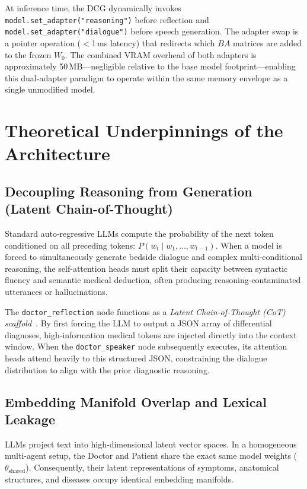 At inference time, the DCG dynamically invokes \texttt{model.set\_adapter("reasoning")} before reflection and \texttt{model.set\_adapter("dialogue")} before speech generation. The adapter swap is a pointer operation ($<$1\,ms latency) that redirects which $BA$ matrices are added to the frozen $W_0$. The combined VRAM overhead of both adapters is approximately 50\,MB---negligible relative to the base model footprint---enabling this dual-adapter paradigm to operate within the same memory envelope as a single unmodified model.

\section{Theoretical Underpinnings of the Architecture}

\subsection{Decoupling Reasoning from Generation (Latent Chain-of-Thought)}

Standard auto-regressive LLMs compute the probability of the next token conditioned on all preceding tokens: $P(w_t \mid w_1, \ldots, w_{t-1})$. When a model is forced to simultaneously generate bedside dialogue and complex multi-conditional reasoning, the self-attention heads must split their capacity between syntactic fluency and semantic medical deduction, often producing reasoning-contaminated utterances or hallucinations.

The \texttt{doctor\_reflection} node functions as a \textit{Latent Chain-of-Thought (CoT) scaffold}~\cite{wang2024survey}. By first forcing the LLM to output a JSON array of differential diagnoses, high-information medical tokens are injected directly into the context window. When the \texttt{doctor\_speaker} node subsequently executes, its attention heads attend heavily to this structured JSON, constraining the dialogue distribution to align with the prior diagnostic reasoning.

\subsection{Embedding Manifold Overlap and Lexical Leakage}

LLMs project text into high-dimensional latent vector spaces. In a homogeneous multi-agent setup, the Doctor and Patient share the exact same model weights ($\theta_{\text{shared}}$). Consequently, their latent representations of symptoms, anatomical structures, and diseases occupy identical embedding manifolds.

